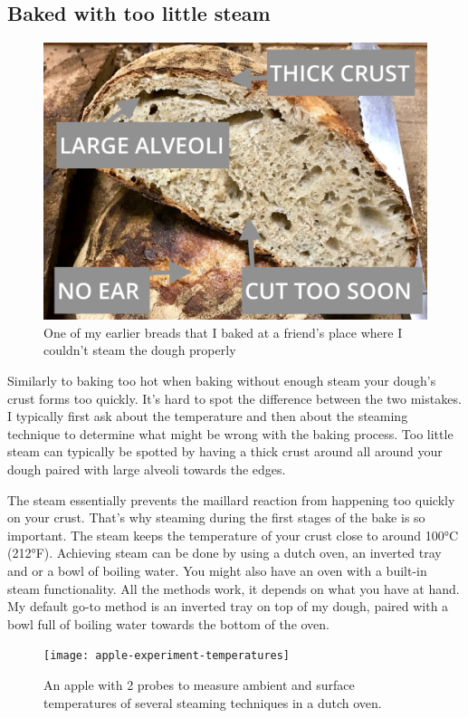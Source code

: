 \subsection{Baked with too little steam}

\begin{figure}[h]
  \includegraphics[width=\textwidth]{no-steam}
  \caption{One of my earlier breads that I baked at a friend's place where
  I couldn't steam the dough properly}
  \label{no-steam}
\end{figure}

Similarly to baking too hot when baking without enough steam your dough's crust
forms too quickly. It's hard to spot the difference between the two mistakes.
I typically first ask about the temperature and then about the steaming technique
to determine what might be wrong with the baking process. Too little steam can
typically be spotted by having a thick crust around all around your dough paired
with large alveoli towards the edges.

The steam essentially prevents the maillard reaction from happening too quickly
on your crust. That's why steaming during the first stages of the bake is so important.
The steam keeps the temperature of your crust close to around 100°C (212°F). Achieving steam
can be done by using a dutch oven, an inverted tray and or a bowl of boiling water.
You might also have an oven with a built-in steam functionality. All the methods work,
it depends on what you have at hand. My default go-to method is an inverted
tray on top of my dough, paired with a bowl full of boiling water towards the bottom
of the oven.

\begin{figure}
  \texttt{[image: apple-experiment-temperatures]}
  \caption{An apple with 2 probes to measure ambient
  and surface temperatures of several steaming techniques
  in a dutch oven.}
  \label{apple-experiment-temperatures}
\end{figure}

